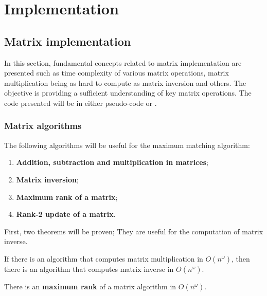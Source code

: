 \chapter{Implementation}

\section{Matrix implementation}

In this section, fundamental concepts related to matrix implementation are presented such as time complexity of various matrix operations,
matrix multiplication being as hard to compute as matrix inversion and others.
The objective is providing a sufficient understanding of key matrix operations.
The code presented will be in either pseudo-code or .

\subsection{Matrix algorithms}

The following algorithms will be useful for the maximum matching algorithm: 
\begin{enumerate}
    \item \textbf{Addition, subtraction and multiplication in matrices};
    \item \textbf{Matrix inversion};
    \item \textbf{Maximum rank of a matrix};
    \item \textbf{Rank-2 update of a matrix}.
\end{enumerate}

First, two theorems will be proven; They are useful for the computation of matrix inverse.

\begin{theorem}
    If there is an algorithm that computes matrix multiplication in \(O(n^{\omega})\), then
    there is an algorithm that computes matrix inverse in \(O(n^{\omega})\).
\end{theorem}

There is an \textbf{maximum rank} of a matrix algorithm in \(O(n^{\omega})\).